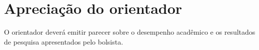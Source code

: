 \chapter{Apreciação do orientador}\label{ch:introducao}
O orientador deverá emitir parecer sobre o desempenho acadêmico e os resultados de pesquisa apresentados pelo bolsista. 